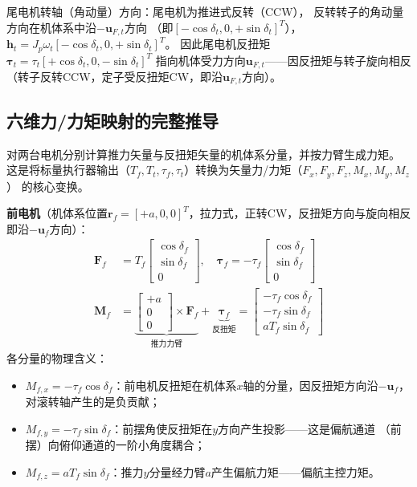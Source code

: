 尾电机转轴（角动量）方向：尾电机为推进式反转（CCW），
反转转子的角动量方向在机体系中沿$-\bm{u}_{F,t}$方向
（即$[-\cos\delta_t, 0, +\sin\delta_t]^T$），
$\bm{h}_t = J_p \omega_t [-\cos\delta_t, 0, +\sin\delta_t]^T$。
因此尾电机反扭矩$\bm{\tau}_t = \tau_t [+\cos\delta_t, 0, -\sin\delta_t]^T$
指向机体受力方向$\bm{u}_{F,t}$——因反扭矩与转子旋向相反
（转子反转CCW，定子受反扭矩CW，即沿$\bm{u}_{F,t}$方向）。

\subsection{六维力/力矩映射的完整推导}

对两台电机分别计算推力矢量与反扭矩矢量的机体系分量，并按力臂生成力矩。
这是将标量执行器输出（$T_f, T_t, \tau_f, \tau_t$）转换为矢量力/力矩（$F_x, F_y, F_z, M_x, M_y, M_z$）
的核心变换。



\textbf{前电机}（机体系位置$\bm{r}_f = [+a, 0, 0]^T$，拉力式，正转CW，反扭矩方向与旋向相反即沿$-\bm{u}_f$方向）：
\begin{align}
    \bm{F}_f &= T_f \begin{bmatrix} \cos\delta_f \\ \sin\delta_f \\ 0 \end{bmatrix},
    \quad
    \bm{\tau}_f = -\tau_f \begin{bmatrix} \cos\delta_f \\ \sin\delta_f \\ 0 \end{bmatrix}
    \label{eq:front_force} \\
    \bm{M}_f &= \underbrace{\begin{bmatrix} +a \\ 0 \\ 0 \end{bmatrix} \times \bm{F}_f}_{\text{推力力臂}}
             + \underbrace{\bm{\tau}_f}_{\text{反扭矩}}
             = \begin{bmatrix}
                 -\tau_f \cos\delta_f \\
                 -\tau_f \sin\delta_f \\
                 a T_f \sin\delta_f
               \end{bmatrix}
    \label{eq:front_moment}
\end{align}
各分量的物理含义：
\begin{itemize}
    \item $M_{f,x} = -\tau_f \cos\delta_f$：前电机反扭矩在机体系$x$轴的分量，因反扭矩方向沿$-\bm{u}_f$，
          对滚转轴产生的是负贡献；
    \item $M_{f,y} = -\tau_f \sin\delta_f$：前摆角使反扭矩在$y$方向产生投影——这是偏航通道
          （前摆）向俯仰通道的一阶小角度耦合；
    \item $M_{f,z} = a T_f \sin\delta_f$：推力$y$分量经力臂$a$产生偏航力矩——偏航主控力矩。
\end{itemize}

